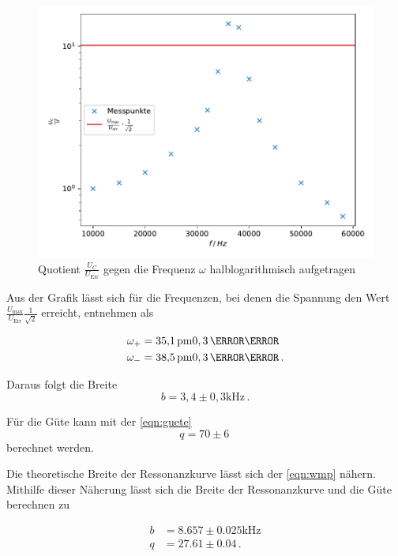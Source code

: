 \begin{figure}
    \centering
    \label{fig:1}
    \includegraphics{Daten/c.pdf}
    \caption{Quotient $\frac{U_C}{U_\text{Err}}$ gegen die Frequenz $\omega$ halblogarithmisch aufgetragen}
\end{figure}


\noindent
Aus der Grafik lässt sich für die Frequenzen, bei denen die Spannung den Wert $\frac{U_\text{max}}{U_\text{Err}}\frac{1}{\sqrt{2}}$ erreicht, entnehmen als

\begin{align*}
    \omega_+ &= \SI{35,1} \pm 0,3 \,  {\kilo\hertz} \\
    \omega_- &= \SI{38,5} \pm 0,3 \,  {\kilo\hertz} \, .
\end{align*}

\noindent
Daraus folgt die Breite 
\begin{equation*}
    b = 3,4 \pm 0,3 \si{\kilo\hertz} \, .
\end{equation*}

Für die Güte kann mit der \autoref{eqn:guete} $$ q = 70 \pm 6 \, $$ berechnet werden. 

\noindent
Die theoretische Breite der Ressonanzkurve lässt sich der \autoref{eqn:wmp} nähern. Mithilfe dieser Näherung lässt sich die Breite der Ressonanzkurve und die Güte berechnen zu %

\begin{align*}
    b & = 8.657 \pm 0.025 \si{\kilo\hertz}\\
    q & = 27.61\pm 0.04 \, . 
\end{align*}




